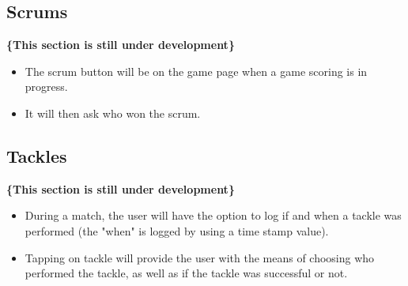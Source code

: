 \documentclass[hidelinks,a4paper,12pt]{article}
\begin{document}
	\subsection{Scrums}
	{\bfseries\{This section is still under development\}}
		\begin{itemize}
			\item The scrum button will be on the game page when a game scoring is in progress.
			\item It will then ask who won the scrum.
		\end{itemize}
		
	\subsection{Tackles}
	{\bfseries\{This section is still under development\}}
		\begin{itemize}
			\item During a match, the user will have the option to log if and when a tackle was performed (the "when" is logged by using a time stamp value).
			\item Tapping on tackle will provide the user with the means of choosing who performed the tackle, as well as if the tackle was successful or not.
		\end{itemize}
\end{document}
